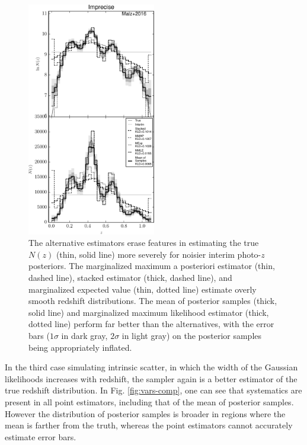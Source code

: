 \documentclass[preprint]{aastex}
\begin{document}
\begin{figure}
\includegraphics[width=0.5\textwidth]{figs/sig4/comps.pdf}
\caption{The alternative estimators erase features in estimating the true 
$N(z)$ (thin, solid line) more severely for noisier interim photo-$z$ 
posteriors.  The marginalized maximum a posteriori estimator (thin, dashed 
line), stacked estimator (thick, dashed line), and marginalized expected value 
(thin, dotted line) estimate overly smooth redshift distributions.  The mean of 
posterior samples (thick, solid line) and marginalized maximum likelihood 
estimator (thick, dotted line) perform far better than the alternatives, with 
the error bars ($1\sigma$ in dark gray, $2\sigma$ in light gray) on the 
posterior samples being appropriately inflated.}
\label{fig:sig4-comp}
\end{figure}

In the third case simulating intrinsic scatter, in which the width of the 
Gaussian likelihoods increases with redshift, the sampler again is a better 
estimator of the true redshift distribution.  In Fig. \ref{fig:vars-comp}, one 
can see that systematics are present in all point estimators, including that of 
the mean of posterior samples.  However the distribution of posterior samples 
is broader in regions where the mean is farther from the truth, whereas the 
point estimators cannot accurately estimate error bars.
\end{document}

